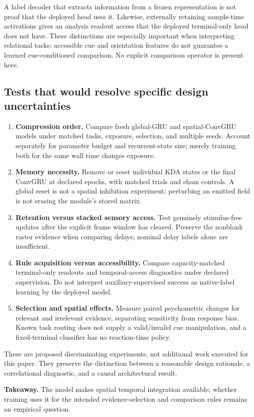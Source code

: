 \documentclass[10pt,letterpaper]{article}
\newcommand{\takeaway}[1]{\par\smallskip\noindent\textbf{Takeaway.} #1}
\begin{document}
A label decoder that extracts information from a frozen representation is not proof that the deployed head uses it. Likewise, externally retaining sample-time activations gives an analysis readout access that the deployed terminal-only head does not have. These distinctions are especially important when interpreting relational tasks: accessible cue and orientation features do not guarantee a learned cue-conditioned comparison. No explicit comparison operator is present here.

\subsection{Tests that would resolve specific design uncertainties}
\begin{enumerate}[label=\textbf{\arabic*.}]
\item \textbf{Compression order.} Compare fresh global-GRU and spatial-ConvGRU models under matched tasks, exposure, selection, and multiple seeds. Account separately for parameter budget and recurrent-state size; merely training both for the same wall time changes exposure.
\item \textbf{Memory necessity.} Remove or reset individual KDA states or the final ConvGRU at declared epochs, with matched trials and sham controls. A global reset is not a spatial inhibition experiment; perturbing an emitted field is not erasing the module's stored matrix.
\item \textbf{Retention versus stacked sensory access.} Test genuinely stimulus-free updates after the explicit frame window has cleared. Preserve the nonblank raster evidence when comparing delays; nominal delay labels alone are insufficient.
\item \textbf{Rule acquisition versus accessibility.} Compare capacity-matched terminal-only readouts and temporal-access diagnostics under declared supervision. Do not interpret auxiliary-supervised success as native-label learning by the deployed model.
\item \textbf{Selection and spatial effects.} Measure paired psychometric changes for relevant and irrelevant evidence, separating sensitivity from response bias. Known task routing does not supply a valid/invalid cue manipulation, and a fixed-terminal classifier has no reaction-time policy.
\end{enumerate}
These are proposed discriminating experiments, not additional work executed for this paper. They preserve the distinction between a reasonable design rationale, a correlational diagnostic, and a causal architectural result.
\takeaway{The model makes spatial temporal integration available; whether training uses it for the intended evidence-selection and comparison rules remains an empirical question.}
\end{document}
